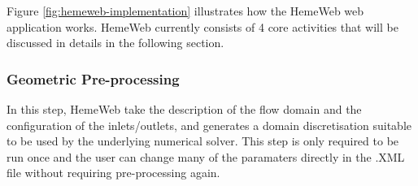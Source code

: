 \noindent%
\begin{minipage}{\linewidth}%
\label{fig:hemeweb-implementation}%
\end{minipage}

\vspace{1cm}

Figure \ref{fig:hemeweb-implementation} illustrates how the HemeWeb web application works. HemeWeb currently consists of 4 core activities that will be discussed in details in the following section.

\subsubsection{Geometric Pre-processing}

In this step, HemeWeb take the description of the flow domain and the configuration of the inlets/outlets, and generates a domain discretisation suitable to be used by the underlying numerical solver.  This step is only required to be run once and the user can change many of the paramaters directly in the .XML file without requiring pre-processing again. 



\vspace{1cm}

\noindent%
\begin{minipage}{\linewidth}%
\label{fig:hemeweb-pre-processing}%
\end{minipage}

